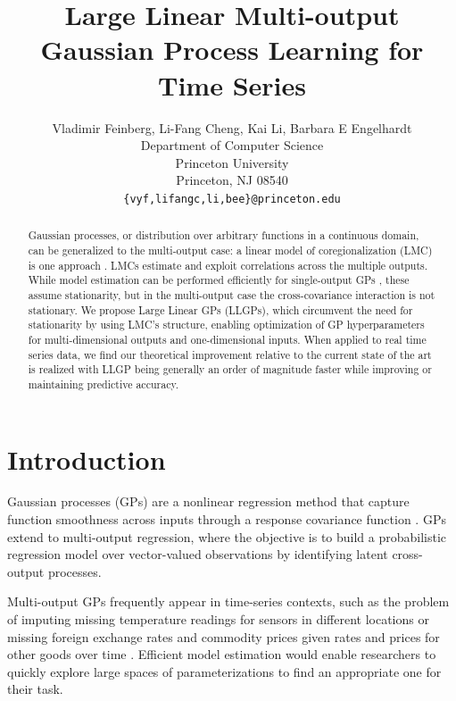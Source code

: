 \documentclass{article}
\title{Large Linear Multi-output Gaussian Process Learning for Time Series}
\author{
  Vladimir Feinberg, Li-Fang Cheng,  {Kai Li}, {Barbara E Engelhardt}\\
  Department of Computer Science\\
  Princeton University\\
  Princeton, NJ 08540 \\
  \texttt{\{vyf,lifangc,li,bee\}@princeton.edu} \\
}
\begin{document}
\maketitle

\begin{abstract}
Gaussian processes, or distribution over arbitrary functions in a continuous domain, can be generalized to the multi-output case: a linear model of coregionalization (LMC) is one approach \cite{alvarez2012kernels}. LMCs estimate and exploit correlations across the multiple outputs.
While model estimation can be performed efficiently for single-output GPs \cite{msgp}, these assume stationarity, but in the multi-output case the cross-covariance interaction is not stationary.
We propose Large Linear GPs (LLGPs), which circumvent the need for stationarity by using LMC's structure, enabling optimization of GP hyperparameters for multi-dimensional outputs and one-dimensional inputs. When applied to real time series data, we find our theoretical improvement relative to the current state of the art is realized with LLGP being generally an order of magnitude faster while improving or maintaining predictive accuracy.
\end{abstract}


\section{Introduction}\label{introduction}

Gaussian processes (GPs) are a nonlinear regression method that capture function smoothness across inputs through a response covariance function \cite{williams1996gaussian}. GPs extend to multi-output regression, where the objective is to build a probabilistic regression model over vector-valued observations by identifying latent cross-output processes.

Multi-output GPs frequently appear in time-series contexts, such as the problem of imputing missing temperature readings for sensors in different locations or missing foreign exchange rates and commodity prices given rates and prices for other goods over time \cite{osborne2008towards, alvarez2010efficient}. Efficient model estimation would enable researchers to quickly explore large spaces of parameterizations to find an appropriate one for their task.
\end{document}
